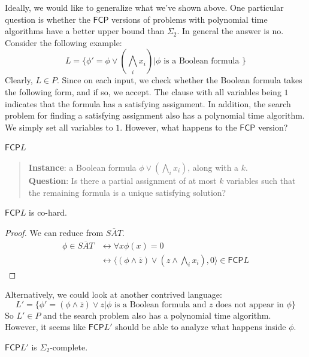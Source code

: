 \documentclass[runningheads,a4paper]{llncs}
\begin{document}
Ideally, we would like to generalize what we've shown above. One particular question is whether the $\mathsf{FCP}$ versions of problems with polynomial time algorithms have a better upper bound than $\Sigma_2$. In general the answer is no. Consider the following example:
\[ L = \{ \phi' = \phi \vee \left( \bigwedge_i x_i \right) | \phi \text{ is a Boolean formula }\} \]
Clearly, $L \in P$. Since on each input, we check whether the Boolean formula takes the following form, and if so, we accept. The clause with all variables being $1$ indicates that the formula has a satisfying assignment. In addition, the search problem for finding a satisfying assignment also has a polynomial time algorithm. We simply set all variables to $1$. However, what happens to the $\mathsf{FCP}$ version?

$\mathsf{FCP} L$ 
\begin{quote}
\textbf{Instance}: a Boolean formula $\phi \vee \left( \bigwedge_i x_i\right)$, along with a $k$.\\
\textbf{Question}: Is there a partial assignment of at most $k$ variables such that the remaining formula is a unique satisfying solution?
\end{quote}

\begin{proposition}
$\mathsf{FCP} L$ is co\NP-hard.
\end{proposition}

\begin{proof}
We can reduce from $\overline{SAT}$. 
\begin{align}
\phi \in \overline{SAT} &\leftrightarrow \forall x \phi(x) = 0 \\
				    & \leftrightarrow \langle (\phi \wedge \overline{z}) \vee \left(z \wedge \bigwedge_i x_i \right), 0 \rangle \in \mathsf{FCP} L
\end{align}
\end{proof}

Alternatively, we could look at another contrived language:
\[ L' = \{ \phi' = (\phi \wedge \overline{z}) \vee z | \phi \text{ is a Boolean formula and $z$ does not appear in $\phi$} \} \]
So $L' \in P$ and the search problem also has a polynomial time algorithm. However, it seems like $\mathsf{FCP} L'$ should be able to analyze what happens inside $\phi$. 

\begin{proposition}
$\mathsf{FCP} L'$ is $\Sigma_2$-complete. 
\end{proposition}
\end{document}
